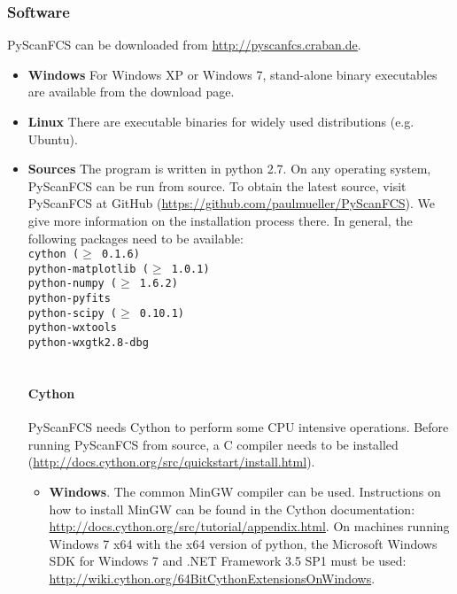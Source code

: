 \subsubsection*{Software}
PyScanFCS can be downloaded from \url{http://pyscanfcs.craban.de}.
\begin{itemize}
\item \textbf{Windows}
For Windows XP or Windows 7, stand-alone binary executables are available from the download page. 
\item \textbf{Linux}
There are executable binaries for widely used distributions (e.g. Ubuntu).
\item \textbf{Sources}
The program is written in python 2.7. On any operating system, PyScanFCS can be run from source. To obtain the latest source, visit PyScanFCS at GitHub (\url{https://github.com/paulmueller/PyScanFCS}). We give more information on the installation process there. In general, the following packages need to be available:
\texttt{\\
cython ($\geq$ 0.1.6)\\
python-matplotlib ($\geq$ 1.0.1) \\
python-numpy ($\geq$ 1.6.2) \\
python-pyfits \\
python-scipy ($\geq$ 0.10.1) \\
python-wxtools \\
python-wxgtk2.8-dbg \\
}
\\

\paragraph*{Cython}
PyScanFCS needs Cython to perform some CPU intensive operations. Before running PyScanFCS from source, a C compiler needs to be installed (\url{http://docs.cython.org/src/quickstart/install.html}).
\begin{itemize}
\item[ ] \textbf{Windows}. The common MinGW compiler can be used. Instructions on how to install MinGW can be found in the Cython documentation: \url{http://docs.cython.org/src/tutorial/appendix.html}. On machines running Windows 7 x64 with the x64 version of python, the Microsoft Windows SDK for Windows 7 and .NET Framework 3.5 SP1 must be used: \\
\url{http://wiki.cython.org/64BitCythonExtensionsOnWindows}.


\end{itemize}
\end{itemize}
